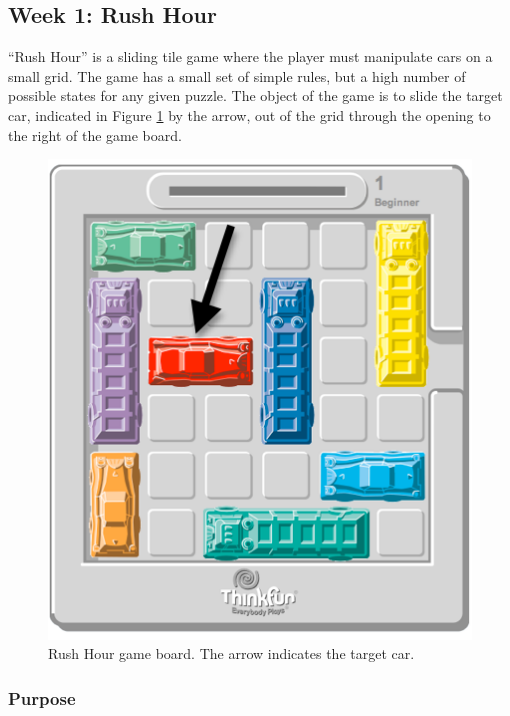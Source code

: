 \subsection{Week 1: Rush Hour}
	
	\textquotedblleft{}Rush Hour\textquotedblright{} is a sliding tile game where the player must manipulate cars on a small grid. The game has a small set of simple rules, but a high number of possible states for any given puzzle. The object of the game is to slide the target car, indicated in Figure \ref{fig:rushhourgame} by the arrow, out of the grid through the opening to the right of the game board. 
	
	\begin{figure}
	\begin{centering}
	\includegraphics[height=0.35\textheight]{images/rushour-2}
	\par\end{centering}
	
	\caption{Rush Hour game board. The arrow indicates the target car.}
	\label{fig:rushhourgame}
	\end{figure}
	
	\subsubsection{Purpose}
	
